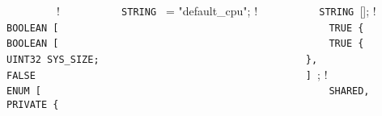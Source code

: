 {%
\lstinline!        !\quad \quad{} {             ! \newline
\lstinline!          STRING ! = "default_cpu";    ! \newline
\lstinline!          STRING ![];             ! \newline
\lstinline!                                                     ! \newline
\lstinline!          BOOLEAN [                                  ! \newline
\lstinline!            TRUE {                                   ! \newline
\lstinline!              BOOLEAN [                              ! \newline
\lstinline!                TRUE {                               ! \newline
\lstinline!                  UINT32 SYS_SIZE;                   ! \newline
\lstinline!                },                                   ! \newline
\lstinline!                FALSE                                ! \newline
\lstinline!              ] !;              ! \newline
\lstinline!              ENUM [                                 ! \newline
\lstinline!                SHARED,                              ! \newline
\lstinline!                PRIVATE {                            ! \newline
}}

